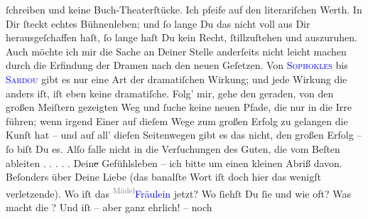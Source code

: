 \documentclass[twoside=false,titlepage=false,open=any, parskip=never, fontsize=12pt, headings=small, chapterprefix=false, appendixprefix=false]{scrbook}
\newcommand{\strikeout}[1]{\sout{#1}}
\newcommand{\dotsfive}{%
.\kern\ellipsisgap 
.\kern\ellipsisgap
.\kern\ellipsisgap
.\kern\ellipsisgap 
.\kern\ellipsisgap 
\relax}
\newcommand{\Theight}{\dimexpr\fontcharht\font`W}
\newcommand{\pbposition}{\depth}
\newcommand{\pb}{\nobreak\hspace{0pt}\raisebox{-0.1em}{\raisebox{\pbposition}{\textnormal{|}}}\nobreak\hspace{0pt}}
\newcommand{\substVorne}{\textnormal{\raisebox{\Theight}{\raisebox{-\height}{\rotatebox[origin=c]{180}{v}\normalsize}}}}
\newcommand{\substDazwischen}{}
\newcommand{\substHinten}{\textnormal{\raisebox{\Theight}{\raisebox{-\height}{\small{v}\normalsize}}}}
\begin{document}
               ſchreiben und keine Buch-Theaterſtücke. Ich pfeife auf den literariſchen Werth. In
               Dir ſteckt echtes Bühnenleben; und ſo lange Du das nicht voll aus Dir
               herausgeſchaffen haſt, ſo lange haſt Du kein Recht, ſtillzuſtehen und auszuruhen.
               Auch möchte ich mir die Sache an Deiner Stelle anderſeits nicht leicht machen durch
               die Erfindung der Dramen nach den neuen Geſetzen. Von \textsc{\textcolor{blue}{Sophokles}{}\ledrightnote{\textcolor{blue}{Sophokles}}} bis \textsc{\textcolor{blue}{Sardou}{}\ledrightnote{\textcolor{blue}{Victorien Sardou}}} gibt es nur eine Art der dramatiſchen Wirkung; und jede Wirkung die anders iſt,
               iſt eben keine dramatiſche. Folg’ mir, gehe den geraden, von den großen Meiſtern
               gezeigten Weg und ſuche keine neuen Pfade, die nur in die Irre führen; wenn irgend
               Einer auf dieſem Wege zum großen Erfolg zu gelangen die Kunſt hat – und auf all’
               dieſen Seitenwegen gibt es das nicht, den großen Erfolg – ſo biſt Du es. Alſo falle
               nicht in {\pb}die Verſuchungen des Guten, die vom Beſten
                  ableiten{\dotsfive}\pend
           \pstart
           Dein\strikeout{e} Gefühlsleben – ich bitte um einen kleinen Abriß
               davon. Beſonders über Deine Liebe (das banalſte Wort iſt doch hier das wenigſt
               verletzende). Wo iſt das \substVorne{}\textsuperscript{\textcolor{gray}{Mädel}}\substDazwischen{}\textcolor{blue}{Fräulein}{}\substHinten{} jetzt? Wo ſiehſt Du ſie und wie oft? Was macht die \label{K_L02668-44v}\label{K_L02668-44h}? Und iſt – aber ganz ehrlich! – noch
\end{document}
